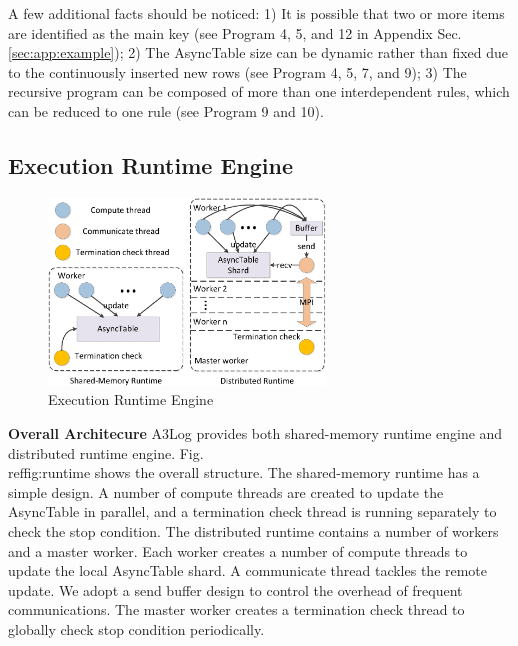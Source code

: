 A few additional facts should be noticed: 1) It is possible that two or more items are identified as the main key (see Program 4, 5, and 12 in Appendix Sec. \ref{sec:app:example}); 2) The AsyncTable size can be dynamic rather than fixed due to the continuously inserted new rows (see Program 4, 5, 7, and 9); 3) The recursive program can be composed of more than one interdependent rules, which can be reduced to one rule (see Program 9 and 10).

\subsection{Execution Runtime Engine}
\label{sec:system:runtime}

\begin{figure}[!t]
    \centering
  \includegraphics[width=2.9in]{fig/runtime}
  \vspace{-0.1in}
  \caption{Execution Runtime Engine}
  \label{fig:runtime}
  \vspace{-0.1in}
\end{figure}

\noindent\textbf{Overall Architecure}
A3Log provides both shared-memory runtime engine and distributed runtime engine. Fig.\\ref{fig:runtime} shows the overall structure. The shared-memory runtime has a simple design. A number of compute threads are created to update the AsyncTable in parallel, and a termination check thread is running separately to check the stop condition. The distributed runtime contains a number of workers and a master worker. Each worker creates a number of compute threads to update the local AsyncTable shard. A communicate thread tackles the remote update. We adopt a send buffer design to control the overhead of frequent communications. The master worker creates a termination check thread to globally check stop condition periodically.


